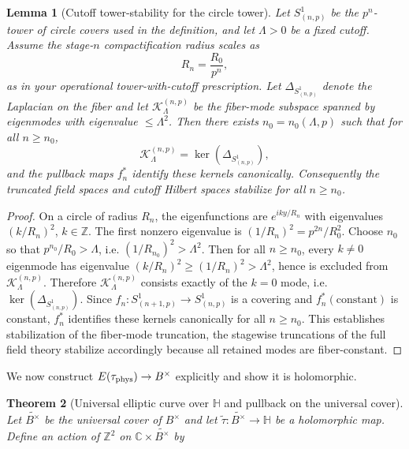 \documentclass[11pt]{article}
\newtheorem{theorem}{Theorem}[section]
\newtheorem{lemma}[theorem]{Lemma}
\theoremstyle{remark}
\begin{document}
{\begin{lemma}[Cutoff tower-stability for the circle tower]
\label{lem:tower_stability}
Let $S^1_{(n,p)}$ be the $p^n$-tower of circle covers used in the definition, and let $\Lambda>0$ be a fixed cutoff.
Assume the stage-$n$ compactification radius scales as
\begin{equation}
R_n=\frac{R_0}{p^n},
\end{equation}
as in your operational tower-with-cutoff prescription.
Let $\Delta_{S^1_{(n,p)}}$ denote the Laplacian on the fiber and let $\mathcal{K}_{\Lambda}^{(n,p)}$
be the fiber-mode subspace spanned by eigenmodes with eigenvalue $\le\Lambda^2$.
Then there exists $n_0=n_0(\Lambda,p)$ such that for all $n\ge n_0$,
\begin{equation}
\mathcal{K}_{\Lambda}^{(n,p)}=\ker(\Delta_{S^1_{(n,p)}}),
\end{equation}
and the pullback maps $f_n^*$ identify these kernels canonically. Consequently the truncated field spaces and
cutoff Hilbert spaces stabilize for all $n\ge n_0$.
\end{lemma}

\begin{proof}
On a circle of radius $R_n$, the eigenfunctions are $e^{ik y/R_n}$ with eigenvalues $(k/R_n)^2$, $k\in\mathbb{Z}$.
The first nonzero eigenvalue is $(1/R_n)^2 = p^{2n}/R_0^2$.
Choose $n_0$ so that $p^{n_0}/R_0>\Lambda$, i.e. $(1/R_{n_0})^2>\Lambda^2$.
Then for all $n\ge n_0$, every $k\ne 0$ eigenmode has eigenvalue $(k/R_n)^2\ge (1/R_n)^2>\Lambda^2$,
hence is excluded from $\mathcal{K}_{\Lambda}^{(n,p)}$. Therefore $\mathcal{K}_{\Lambda}^{(n,p)}$ consists
exactly of the $k=0$ mode, i.e. $\ker(\Delta_{S^1_{(n,p)}})$.
Since $f_n:S^1_{(n+1,p)}\to S^1_{(n,p)}$ is a covering and $f_n^*(\text{constant})$ is constant, $f_n^*$
identifies these kernels canonically for all $n\ge n_0$.
This establishes stabilization of the fiber-mode truncation, the stagewise truncations of the full field theory
stabilize accordingly because all retained modes are fiber-constant.
\end{proof}

We now construct $E(\tau_{\rm phys})\to B^{\times}$ explicitly and show it is holomorphic.

\begin{theorem}[Universal elliptic curve over $\mathbb{H}$ and pullback on the universal cover]
\label{thm:universal_pullback}
Let $\widetilde{B^{\times}}$ be the universal cover of $B^{\times}$ and let
$\widetilde{\tau}  : \widetilde{B^{\times}} \to \mathbb{H}$
be a holomorphic map. Define an action of $\mathbb{Z}^{2}$ on
$\mathbb{C} \times \widetilde{B^{\times}}$ by


\end{theorem}}
\end{document}

